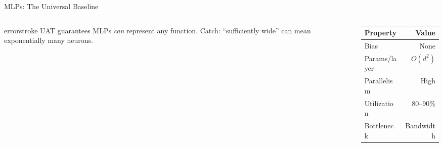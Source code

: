 \documentclass[aspectratio=169, 12pt]{beamer}
\begin{document}
\begin{frame}{MLPs: The Universal Baseline}
\begin{columns}[T]
\begin{column}{0.55\textwidth}
    \vspace{0.1cm}
    \begin{mlsyscard}{errorstroke}
    {\footnotesize UAT guarantees MLPs \emph{can} represent any function. Catch: ``sufficiently wide'' can mean exponentially many neurons.}
    \end{mlsyscard}
  \end{column}
  \begin{column}{0.42\textwidth}
    \renewcommand{\arraystretch}{1.05}
    {\scriptsize
    \begin{tabular}{@{}lr@{}}
      \toprule
      \textbf{Property} & \textbf{Value} \\
      \midrule
      Bias & None \\
      Params/layer & $O(d^2)$ \\
      Parallelism & High \\
      Utilization & 80--90\% \\
      Bottleneck & Bandwidth \\
      \bottomrule
    \end{tabular}
    }

    \vspace{0.1cm}
  \end{column}
\end{columns}

\end{frame}
\end{document}
